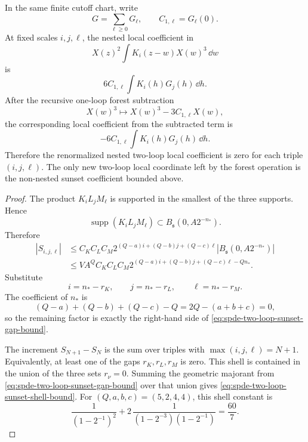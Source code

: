\begin{proposition}
In the same finite cutoff chart, write
\[
  G=\sum_{\ell\geq0}G_\ell,\qquad C_{1,\ell}=G_\ell(0).
\]
At fixed scales \(i,j,\ell\), the nested local coefficient in
\[
  X(z)^2\int K_i(z-w)X(w)^3\,\dd w
\]
is
\[
  6C_{1,\ell}\int K_i(h)G_j(h)\,\dd h .
\]
After the recursive one-loop forest subtraction
\[
  X(w)^3\longmapsto X(w)^3-3C_{1,\ell}X(w),
\]
the corresponding local coefficient from the subtracted term is
\[
  -6C_{1,\ell}\int K_i(h)G_j(h)\,\dd h .
\]
Therefore the renormalized nested two-loop local coefficient is zero for
each triple \((i,j,\ell)\).  The only new two-loop local coordinate left by
the forest operation is the non-nested sunset coefficient bounded above.
\end{proposition}

\begin{proof}
The product \(K_iL_jM_\ell\) is supported in the smallest of the three
supports.  Hence
\[
  \operatorname{supp}(K_iL_jM_\ell)
  \subset B_{\mathfrak s}(0,A2^{-n_*}) .
\]
Therefore
\[
\begin{aligned}
  |S_{i,j,\ell}|
  &\leq
  C_KC_LC_M
  2^{(Q-a)i+(Q-b)j+(Q-c)\ell}
  |B_{\mathfrak s}(0,A2^{-n_*})|                  \\
  &\leq
  V A^Q C_KC_LC_M
  2^{(Q-a)i+(Q-b)j+(Q-c)\ell-Qn_*}.
\end{aligned}
\]
Substitute
\[
  i=n_*-r_K,\qquad j=n_*-r_L,\qquad \ell=n_*-r_M .
\]
The coefficient of \(n_*\) is
\[
  (Q-a)+(Q-b)+(Q-c)-Q=2Q-(a+b+c)=0,
\]
so the remaining factor is exactly the right-hand side of
\eqref{eq:spde-two-loop-sunset-gap-bound}.

The increment \(S_{N+1}-S_N\) is the sum over triples with
\(\max(i,j,\ell)=N+1\).  Equivalently, at least one of the gaps
\(r_K,r_L,r_M\) is zero.  This shell is contained in the union of the three
sets \(r_\nu=0\).  Summing the geometric majorant from
\eqref{eq:spde-two-loop-sunset-gap-bound} over that union gives
\eqref{eq:spde-two-loop-sunset-shell-bound}.  For
\((Q,a,b,c)=(5,2,4,4)\), this shell constant is
\[
  \frac{1}{(1-2^{-1})^2}
  +
  2\,\frac{1}{(1-2^{-3})(1-2^{-1})}
  =
  \frac{60}{7}.
\]


\end{proof}
